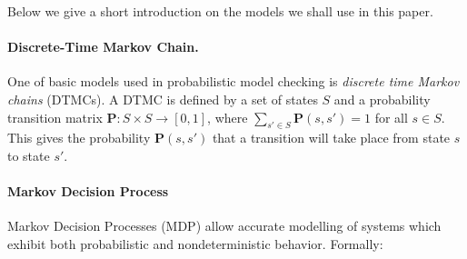 \documentclass{llncs}
\begin{document}
Below we give a short introduction on the models we shall use in
this paper.

\paragraph{Discrete-Time Markov Chain.}

One of basic models used in probabilistic model checking is \emph{discrete time Markov chains} (DTMCs). A DTMC is defined by a
set of states $S$ and a probability transition matrix
$\mathbf{P} : S\times S \rightarrow [0, 1]$, where
$\sum_{s'\in S} \mathbf{P}(s, s') = 1$ for all $s \in  S$. This gives the probability $\mathbf{P}(s, s')$ that a transition
will take place from state $s$ to state $s'$.


\paragraph{Markov Decision Process}

%


Markov Decision Processes (MDP) allow accurate modelling of systems which exhibit
both probabilistic and nondeterministic behavior. Formally:
\end{document}
